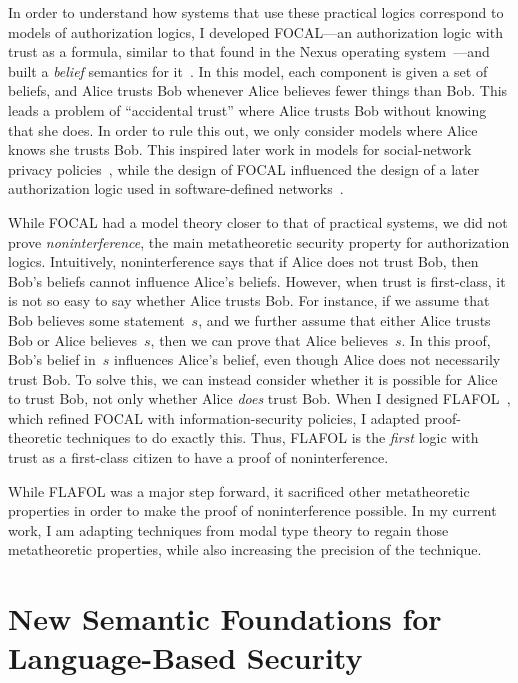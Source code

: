 \documentclass{article}
\theoremstyle{definition}
\begin{document}
In order to understand how systems that use these practical logics correspond to models of authorization logics, I developed FOCAL---an authorization logic with trust as a formula, similar to that found in the Nexus operating system~\citep{SchneiderWS11,SirerDBRSWWS11}---and built a \emph{belief} semantics for it~\citep{HirschC13}.
In this model, each component is given a set of beliefs, and Alice trusts Bob whenever Alice believes fewer things than Bob.
This leads a problem of ``accidental trust'' where Alice trusts Bob without knowing that she does.
In order to rule this out, we only consider models where Alice knows she trusts Bob.
This inspired later work in models for social-network privacy policies~\cite{PardoS17}, while the design of FOCAL influenced the design of a later authorization logic used in software-defined networks~\citep{SkalkaRDKGDSF19}.

While FOCAL had a model theory closer to that of practical systems, we did not prove \emph{noninterference}, the main metatheoretic security property for authorization logics.
Intuitively, noninterference says that if Alice does not trust Bob, then Bob's beliefs cannot influence Alice's beliefs.
However, when trust is first-class, it is not so easy to say whether Alice trusts Bob.
For instance, if we assume that Bob believes some statement~$s$, and we further assume that either Alice trusts Bob or Alice believes~$s$, then we can prove that Alice believes~$s$.
In this proof, Bob's belief in~$s$ influences Alice's belief, even though Alice does not necessarily trust Bob.
To solve this, we can instead consider whether it is possible for Alice to trust Bob, not only whether Alice \emph{does} trust Bob.
When I designed FLAFOL~\cite{HirschACAT20}, which refined FOCAL with information-security policies, I adapted proof-theoretic techniques to do exactly this.
Thus, FLAFOL is the \emph{first} logic with trust as a first-class citizen to have a proof of noninterference.

While FLAFOL was a major step forward, it sacrificed other metatheoretic properties in order to make the proof of noninterference possible.
In my current work, I am adapting techniques from modal type theory to regain those metatheoretic properties, while also increasing the precision of the technique.

\section*{New Semantic Foundations for Language-Based Security}
\end{document}
